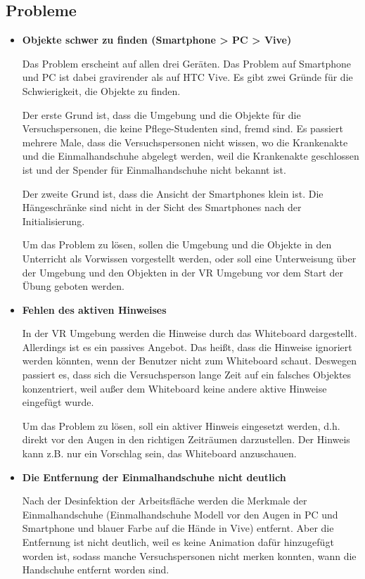 \subsection{Probleme}
\begin{itemize}
    \item \textbf{Objekte schwer zu finden (Smartphone > PC > Vive)}
    
    Das Problem erscheint auf allen drei Geräten. Das Problem auf Smartphone und PC ist dabei gravirender als auf HTC Vive. Es gibt zwei Gründe für die Schwierigkeit, die Objekte zu finden.
    
    Der erste Grund ist, dass die Umgebung und die Objekte für die Versuchspersonen, die keine Pflege-Studenten sind, fremd sind. Es passiert mehrere Male, dass die Versuchspersonen nicht wissen, wo die Krankenakte und die Einmalhandschuhe abgelegt werden, weil die Krankenakte geschlossen ist und der Spender für Einmalhandschuhe nicht bekannt ist.
    
    Der zweite Grund ist, dass die Ansicht der Smartphones klein ist. Die Hängeschränke sind nicht in der Sicht des Smartphones nach der Initialisierung.
    
    Um das Problem zu lösen, sollen die Umgebung und die Objekte in den Unterricht als Vorwissen vorgestellt werden, oder soll eine Unterweisung über der Umgebung und den Objekten in der VR Umgebung vor dem Start der Übung geboten werden.
  
    \item \textbf{Fehlen des aktiven Hinweises}
    
    In der VR Umgebung werden die Hinweise durch das Whiteboard dargestellt. Allerdings ist es ein passives Angebot. Das heißt, dass die Hinweise ignoriert werden könnten, wenn der Benutzer nicht zum Whiteboard schaut. Deswegen passiert es, dass sich die Versuchsperson lange Zeit auf ein falsches Objektes konzentriert, weil außer dem Whiteboard keine andere aktive Hinweise eingefügt wurde.
    
    Um das Problem zu lösen, soll ein aktiver Hinweis eingesetzt werden, d.h. direkt vor den Augen in den richtigen Zeiträumen darzustellen. Der Hinweis kann z.B. nur ein Vorschlag sein, das Whiteboard anzuschauen.
    
    \item \textbf{Die Entfernung der Einmalhandschuhe nicht deutlich}
    
    Nach der Desinfektion der Arbeitsfläche werden die Merkmale der Einmalhandschuhe (Einmalhandschuhe Modell vor den Augen in PC und Smartphone und blauer Farbe auf die Hände in Vive) entfernt. Aber die Entfernung ist nicht deutlich, weil es keine Animation dafür hinzugefügt worden ist, sodass manche Versuchspersonen nicht merken konnten, wann die Handschuhe entfernt worden sind.
    

\end{itemize}
